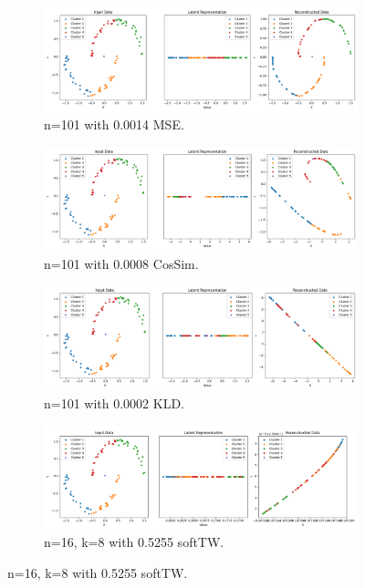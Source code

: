 \begin{figure}[htbp]
  \centering
  \begin{subfigure}[b]{1.0\textwidth}
    \centering
    \includegraphics[width=\linewidth]{images/RQ2/mse/2DMoons_-1_0.0014.png}
    \caption{n=101 with 0.0014 MSE.}
    \label{fig:RQ2/mse/2DMoons}
  \end{subfigure}
  \hfill
  \begin{subfigure}[b]{1.0\textwidth}
    \centering
    \includegraphics[width=\linewidth]{images/RQ2/csi/2DMoons_2_0.0008.png}
    \caption{n=101 with 0.0008 CosSim.}
    \label{fig:RQ2/csi/2DMoons}
  \end{subfigure}
  \hfill
  \begin{subfigure}[b]{1.0\textwidth}
    \centering
    \includegraphics[width=\linewidth]{images/RQ2/kld/2DMoons_-1_0.0002.png}
    \caption{n=101 with 0.0002 KLD.}
    \label{fig:RQ2/kld/2DMoons}
  \end{subfigure}
  \hfill
  \begin{subfigure}[b]{1.0\textwidth}
    \centering
    \includegraphics[width=\linewidth]{images/RQ2/tru/2DMoons_16n_8k_0.5255.png}
    \caption{n=16, k=8 with 0.5255 softTW.}
    \label{fig:RQ2/tru/2DMoons}
  \end{subfigure}


\end{figure}
